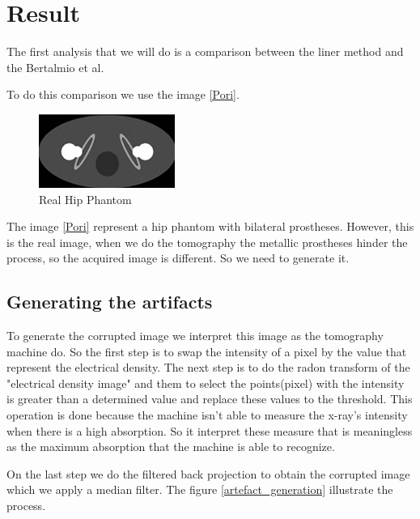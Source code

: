 \chapter{Result}

The first analysis that we will do is a comparison between the liner method and the Bertalmio et al.

To do this comparison we use the image \eqref{Pori}.

\begin{figure}[h]
\centering
\includegraphics[scale=1.2]{img/Pori}
\caption{{Real Hip Phantom}}\label{Pori}
\end{figure}

The image \eqref{Pori} represent a hip phantom with bilateral prostheses. However, this is the real image, when we do the tomography the metallic prostheses hinder the process, so the acquired image is different. So we need to generate it.

\section{Generating the artifacts}

To generate the corrupted image we interpret this image as the tomography machine do. So the first step is to swap the intensity of a pixel by the value that represent the electrical density. The next step is to do the radon transform of the "electrical density image" and them to select the points(pixel) with the intensity is greater than a determined value and replace these values to the threshold. This operation is done because the machine isn't able to measure the x-ray's intensity when there is a high absorption. So it interpret these measure that is meaningless as the maximum absorption that the machine is able to recognize.

On the last step we do the filtered back projection to obtain the corrupted image which we apply a median filter. The figure \eqref{artefact_generation} illustrate the process.

